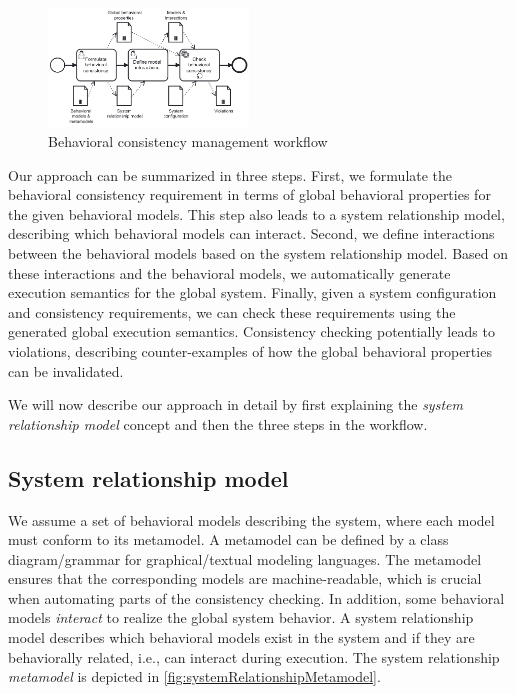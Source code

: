 \documentclass{jot}
\begin{document}
\begin{figure}[h]
    \centering
    \includegraphics[width=0.475\textwidth]{figures/workflow.pdf}
    \caption{Behavioral consistency management workflow}
    \label{fig:approach}
\end{figure}

Our approach can be summarized in three steps.
First, we formulate the behavioral consistency requirement in terms of global behavioral properties for the given behavioral models.
This step also leads to a system relationship model, describing which behavioral models can interact.
Second, we define interactions between the behavioral models based on the system relationship model.
Based on these interactions and the behavioral models, we automatically generate execution semantics for the global system.
Finally, given a system configuration and consistency requirements, we can check these requirements using the generated global execution semantics.
Consistency checking potentially leads to violations, describing counter-examples of how the global behavioral properties can be invalidated.

We will now describe our approach in detail by first explaining the \textit{system relationship model} concept and then the three steps in the workflow.

\subsection{System relationship model}
We assume a set of behavioral models describing the system, where each model must conform to its metamodel.
A metamodel can be defined by a class diagram/grammar for graphical/textual modeling languages.
The metamodel ensures that the corresponding models are machine-readable, which is crucial when automating parts of the consistency checking.
In addition, some behavioral models \emph{interact} to realize the global system behavior.
A system relationship model describes which behavioral models exist in the system and if they are behaviorally related, i.e., can interact during execution.
The system relationship \emph{metamodel} is depicted in \autoref{fig:systemRelationshipMetamodel}.
\end{document}
